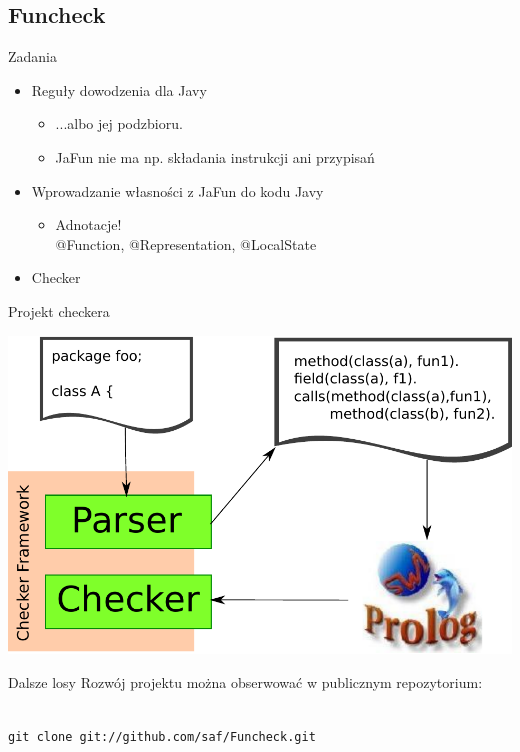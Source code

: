 \documentclass{beamer}
\begin{document}
\subsection{Funcheck}

\begin{frame}{Zadania}
  \begin{itemize}
  \item<1-> Reguły dowodzenia dla Javy
    \pause
    \begin{itemize}
      \item ...albo jej podzbioru.
      \item JaFun nie ma np. składania instrukcji ani przypisań
    \end{itemize}
  \item<3-> Wprowadzanie własności z JaFun do kodu Javy
    \pause
    \begin{itemize}
    \item Adnotacje! \\
      {\color{annot} @Function}, 
      {\color{annot} @Representation}, 
      {\color{annot} @LocalState}
    \end{itemize}
  \item<5-> Checker
  \end{itemize}
\end{frame}

\begin{frame}{Projekt checkera}
  \begin{center}
    \includegraphics[scale=0.6]{img/project.pdf}
  \end{center}
\end{frame}

\begin{frame}{Dalsze losy}
Rozwój projektu można obserwować w publicznym repozytorium:
\begin{center}
\vspace{3mm}
\\
\vspace{3mm}
\texttt{git clone git://github.com/saf/Funcheck.git}
\end{center}
\end{frame}
\end{document}
